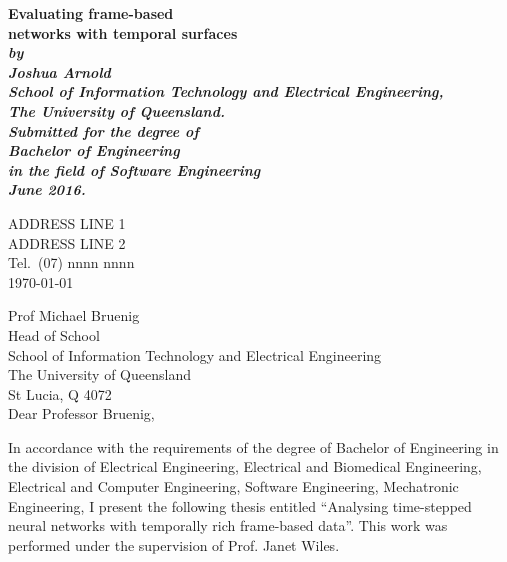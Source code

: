 \documentclass[12pt,openany,a4paper]{book}
\renewcommand{\baselinestretch}{1.2}	%
\begin{document}
\frontmatter

\begin{titlepage}
\renewcommand{\baselinestretch}{1.0}
\begin{center}
\vspace*{35mm}
\Huge\bf
		Evaluating frame-based \\
        networks with temporal surfaces \\
\vspace{20mm}
\large\sl
		by\\
		Joshua Arnold
		\medskip\\
\rm
		School of Information Technology and Electrical Engineering,\\
		The University of Queensland.\\
\vspace{30mm}
		Submitted for the degree of\\
		Bachelor of Engineering
		\smallskip\\
\normalsize
		in the field of Software Engineering
		\medskip\\
\large
		June 2016.		
\end{center}
\end{titlepage}

\cleardoublepage

\begin{flushright}
	ADDRESS LINE 1\\
	ADDRESS LINE 2\\
	Tel.\ (07) nnnn nnnn\\
	\medskip
	\today
\end{flushright}
\begin{flushleft}
  Prof Michael Bruenig\\
  Head of School\\
  School of Information Technology and Electrical Engineering\\
  The University of Queensland\\
  St Lucia, Q 4072\\
  \bigskip\bigskip
  Dear Professor Bruenig,
\end{flushleft}

In accordance with the requirements of the degree of Bachelor of
Engineering in the division of 
Electrical Engineering,
Electrical and Biomedical Engineering,
Electrical and Computer Engineering,
Software Engineering,
Mechatronic Engineering,
I present the
following thesis entitled ``Analysing time-stepped neural networks with temporally rich frame-based data''.  This work was performed under the supervision of Prof. Janet Wiles.
\end{document}
